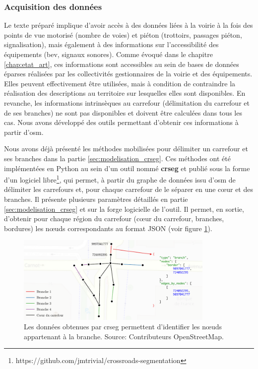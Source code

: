 \subsubsection{Acquisition des données}

Le texte préparé implique d'avoir accès à des données liées à la voirie à la fois des points de vue motorisé (nombre de voies) et piéton (trottoirs, passages piéton, signalisation), mais également à des informations sur l'accessibilité des équipements (\gls{bev}, signaux sonores). Comme évoqué dans le chapitre \ref{chap:etat_art}, ces informations sont accessibles au sein de bases de données éparses réalisées par les collectivités gestionnaires de la voirie et des équipements. Elles peuvent effectivement être utilisées, mais à condition de contraindre la réalisation des descriptions au territoire sur lesquelles elles sont disponibles. En revanche, les informations intrinsèques au carrefour (délimitation du carrefour et de ses branches) ne sont pas disponibles et doivent être calculées dans tous les cas. Nous avons développé des outils permettant d'obtenir ces informations à partir d'\gls{osm}.

\newpar{}

Nous avons déjà présenté les méthodes mobilisées pour délimiter un carrefour et ses branches dans la partie \ref{sec:modelisation_crseg}. Ces méthodes ont été implémentées en Python au sein d'un outil nommé \textbf{crseg} et publié sous la forme d'un logiciel libre\footnote{https://github.com/jmtrivial/crossroads-segmentation}, qui permet, à partir du graphe de données issu d'\gls{osm} de délimiter les carrefours et, pour chaque carrefour de le séparer en une cœur et des branches. Il présente plusieurs paramètres détaillés en partie \ref{sec:modelisation_crseg} et sur la forge logicielle de l'outil. Il permet, en sortie, d'obtenir pour chaque région du carrefour (cœur du carrefour, branches, bordures) les nœuds correspondants au format JSON (voir figure \ref{fig:experimentation_crseg_json}).

\begin{figure}[ht]
    \centering
    \includegraphics[width=0.85\textwidth]{images/experimentation/donnees_crseg.pdf}
    \caption[Données produites par crseg]{Les données obtenues par crseg permettent d'identifier les nœuds appartenant à la branche. Source: Contributeurs OpenStreetMap.}
    \label{fig:experimentation_crseg_json}
\end{figure}

